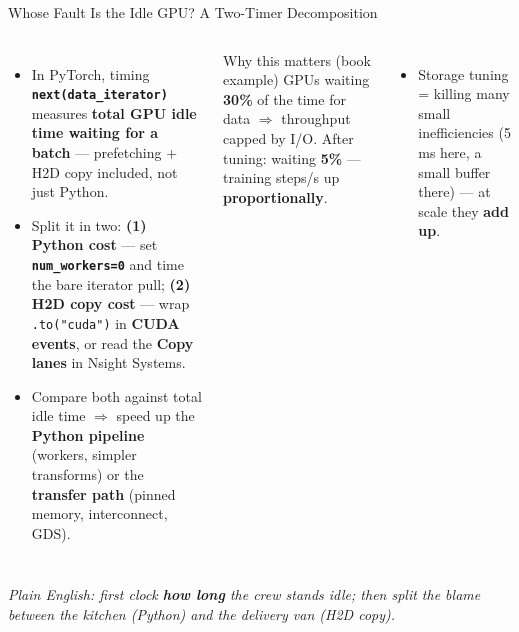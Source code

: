 \documentclass[aspectratio=169]{beamer}
\newcommand{\kw}[1]{\textbf{\textcolor{kwblue}{#1}}}
\newcommand{\pe}[1]{\par{\setlength{\fboxsep}{2.5pt}\noindent\colorbox{navy!9}{\parbox{\dimexpr\textwidth-5pt\relax}{\footnotesize\itshape Plain English: #1}}}}
\begin{document}
\begin{frame}{Whose Fault Is the Idle GPU? A Two-Timer Decomposition}
  \begin{columns}[t]
    \begin{itemize}\small
      \item In PyTorch, timing \kw{\texttt{next(data\_iterator)}} measures \kw{total GPU idle
            time waiting for a batch} --- prefetching + H2D copy included, not just Python.
      \item Split it in two:
            \kw{(1) Python cost} --- set \kw{\texttt{num\_workers=0}} and time the bare
            iterator pull;
            \kw{(2) H2D copy cost} --- wrap \texttt{.to("cuda")} in \kw{CUDA events}, or read
            the \kw{Copy lanes} in Nsight Systems.
      \item Compare both against total idle time $\Rightarrow$ speed up the \kw{Python
            pipeline} (workers, simpler transforms) or the \kw{transfer path}
            (pinned memory, interconnect, GDS).
    \end{itemize}
    \begin{block}{Why this matters (book example)}
      \small GPUs waiting \kw{30\%} of the time for data $\Rightarrow$ throughput capped by
      I/O. After tuning: waiting \kw{5\%} --- training steps/s up \kw{proportionally}.
    \end{block}
    \begin{itemize}\small
      \item Storage tuning = killing many small inefficiencies (5 ms here, a small
            buffer there) --- at scale they \kw{add up}.
    \end{itemize}
  \end{columns}
  \pe{first clock \kw{how long} the crew stands idle; then split the blame between the kitchen (Python) and the delivery van (H2D copy).}
\end{frame}
\end{document}
